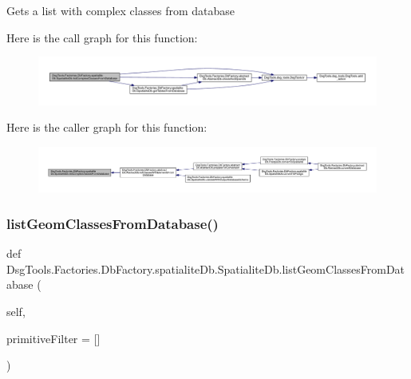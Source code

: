 \begin{DoxyVerb}Gets a list with complex classes from database
\end{DoxyVerb}
 Here is the call graph for this function\+:
\nopagebreak
\begin{figure}[H]
\begin{center}
\leavevmode
\includegraphics[width=350pt]{class_dsg_tools_1_1_factories_1_1_db_factory_1_1spatialite_db_1_1_spatialite_db_a07ea8ea944ac40120fe9bb674d46106b_cgraph}
\end{center}
\end{figure}
Here is the caller graph for this function\+:
\nopagebreak
\begin{figure}[H]
\begin{center}
\leavevmode
\includegraphics[width=350pt]{class_dsg_tools_1_1_factories_1_1_db_factory_1_1spatialite_db_1_1_spatialite_db_a07ea8ea944ac40120fe9bb674d46106b_icgraph}
\end{center}
\end{figure}
\mbox{\label{class_dsg_tools_1_1_factories_1_1_db_factory_1_1spatialite_db_1_1_spatialite_db_a8d2a6e18a5af7a635035c71695f4faf8}} 
\subsubsection{\texorpdfstring{list\+Geom\+Classes\+From\+Database()}{listGeomClassesFromDatabase()}}
{\footnotesize\ttfamily def Dsg\+Tools.\+Factories.\+Db\+Factory.\+spatialite\+Db.\+Spatialite\+Db.\+list\+Geom\+Classes\+From\+Database (\begin{DoxyParamCaption}\item[{}]{self,  }\item[{}]{primitive\+Filter = {\ttfamily \mbox{[}\mbox{]}} }\end{DoxyParamCaption})}

